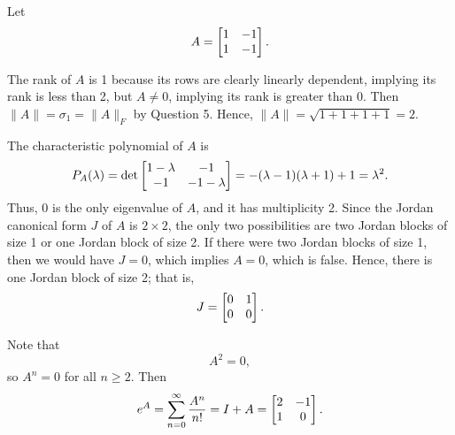 \documentclass{homework}
\begin{document}
	\question Let
	\begin{equation*}
		A = \left[\begin{matrix}1 & - 1 \\ 1 & -1\end{matrix}\right].
	\end{equation*}
	\begin{alphaparts}
		\questionpart The rank of $A$ is 1 because its rows are clearly linearly dependent, implying its rank is less than 2, but $A \ne 0$, implying its rank is greater than 0. Then $\lVert A \rVert = \sigma_1 = \lVert A\rVert_F$ by Question 5. Hence, $\lVert A \rVert = \sqrt{1+1+1+1} =2$.
		
		\questionpart The characteristic polynomial of $A$ is
		\begin{equation*}
			P_A(\lambda) = \det\left[\begin{matrix}1-\lambda & -1 \\ -1 & -1-\lambda\end{matrix}\right] =-(\lambda-1)(\lambda+1) +1 = \lambda^2.
		\end{equation*}
		Thus, 0 is the only eigenvalue of $A$, and it has multiplicity 2. Since the Jordan canonical form $J$ of $A$ is $2\times 2$, the only two possibilities are two Jordan blocks of size 1 or one Jordan block of size 2. If there were two Jordan blocks of size 1, then we would have $J =0$, which implies $A= 0$, which is false. Hence, there is one Jordan block of size 2; that is,
		\begin{equation*}
			J = \left[\begin{matrix}0 & 1 \\ 0 & 0\end{matrix}\right].
		\end{equation*}
		
		\questionpart Note that
		\begin{equation*}
			A^2 = 0,
		\end{equation*}
		so $A^n = 0$ for all $n \ge 2$. Then
		\begin{equation*}
			e^A = \sum_{n=0}^\infty \frac{A^n}{n!} = I + A = \left[\begin{matrix}2 & -1 \\ 1  & 0\end{matrix}\right].
		\end{equation*}
	\end{alphaparts}
\end{document}
